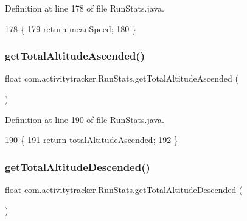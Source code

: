 Definition at line 178 of file Run\+Stats.\+java.


\begin{DoxyCode}
178                                 \{
179         \textcolor{keywordflow}{return} \mbox{\hyperlink{classcom_1_1activitytracker_1_1_run_stats_a64b9e6daf2be19571b8ad401922762c2}{meanSpeed}};
180     \}
\end{DoxyCode}
\mbox{\label{classcom_1_1activitytracker_1_1_run_stats_aefa553b9c74ef8f2fd82204b9b2e70d2}} 
\subsubsection{\texorpdfstring{get\+Total\+Altitude\+Ascended()}{getTotalAltitudeAscended()}}
{\footnotesize\ttfamily float com.\+activitytracker.\+Run\+Stats.\+get\+Total\+Altitude\+Ascended (\begin{DoxyParamCaption}{ }\end{DoxyParamCaption})}



Definition at line 190 of file Run\+Stats.\+java.


\begin{DoxyCode}
190                                             \{
191         \textcolor{keywordflow}{return} \mbox{\hyperlink{classcom_1_1activitytracker_1_1_run_stats_a1108dd2b031415da72508a5172335dd4}{totalAltitudeAscended}};
192     \}
\end{DoxyCode}
\mbox{\label{classcom_1_1activitytracker_1_1_run_stats_a1d0f5d2353a797e1e2dea3c96472e6d8}} 
\subsubsection{\texorpdfstring{get\+Total\+Altitude\+Descended()}{getTotalAltitudeDescended()}}
{\footnotesize\ttfamily float com.\+activitytracker.\+Run\+Stats.\+get\+Total\+Altitude\+Descended (\begin{DoxyParamCaption}{ }\end{DoxyParamCaption})}



